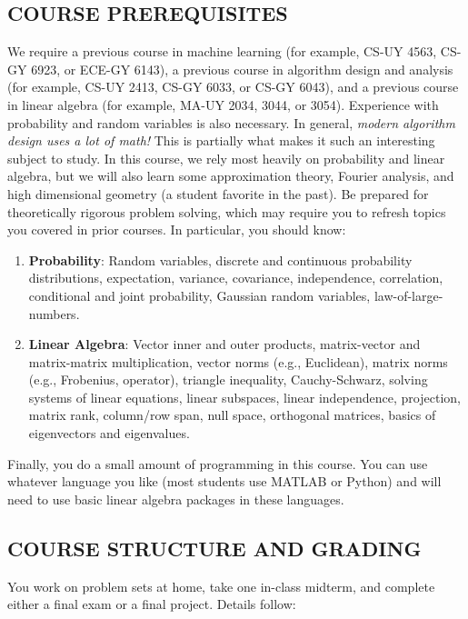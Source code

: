 \documentclass[10pt]{article}
\begin{document}
\subsection{COURSE PREREQUISITES}
We require a previous course in machine learning (for example, CS-UY 4563, CS-GY 6923, or ECE-GY 6143), a previous course in algorithm design and analysis (for example, CS-UY 2413, CS-GY 6033, or CS-GY 6043), and a previous course in linear algebra (for example, MA-UY 2034, 3044, or 3054). Experience with probability and random variables is also necessary. 
In general, \emph{modern algorithm design uses a lot of math!} This is partially what makes it such an interesting subject to study. In this course, we rely most heavily on probability and linear algebra, but we will also learn some approximation theory, Fourier analysis, and high dimensional geometry (a student favorite in the past). Be prepared for theoretically rigorous problem solving, which may require you to refresh topics you covered in prior courses. In particular, you should know:
\begin{enumerate}[leftmargin=*]
	\item \textbf{Probability}: Random variables, discrete and continuous probability distributions, expectation, variance, covariance, independence, correlation, conditional and joint probability, Gaussian random variables, law-of-large-numbers. 
	\item \textbf{Linear Algebra}: Vector inner and outer products, matrix-vector and matrix-matrix multiplication, vector norms (e.g., Euclidean), matrix norms (e.g., Frobenius, operator), triangle inequality, Cauchy-Schwarz, solving systems of linear equations, linear subspaces, linear independence, projection, matrix rank, column/row span, null space, orthogonal matrices, basics of eigenvectors and eigenvalues.
\end{enumerate}
Finally, you do a small amount of programming in this course. You can use whatever language you like (most students use MATLAB or Python) and will need to use basic linear algebra packages in these languages.

\subsection{COURSE STRUCTURE AND GRADING}
You work on problem sets at home, take one in-class midterm, and complete either a final exam or a final project. Details follow:
\end{document}
